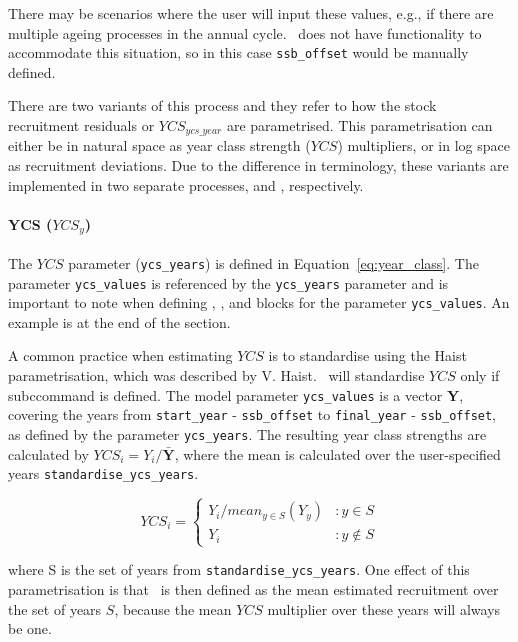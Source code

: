 There may be scenarios where the user will input these values, e.g., if there are multiple ageing processes in the annual cycle. \CNAME\ does not have functionality to accommodate this situation, so in this case \texttt{ssb\_offset} would be manually defined.

There are two variants of this process and they refer to how the stock recruitment residuals or $YCS_{ycs\_year}$ are parametrised. This parametrisation can either be in natural space as year class strength ($YCS$) multipliers, or in log space as recruitment deviations. Due to the difference in terminology, these variants are implemented in two separate processes,  and , respectively.

\paragraph*{YCS ($YCS_y$)}

The $YCS$ parameter (\texttt{ycs\_years}) is defined in Equation~\eqref{eq:year_class}. The parameter \texttt{ycs\_values} is referenced by the \texttt{ycs\_years} parameter and is important to note when defining , , and  blocks for the parameter \texttt{ycs\_values}. An example is at the end of the section.

A common practice when estimating $YCS$ is to standardise using the Haist parametrisation, which was described by V. Haist. \CNAME\ will standardise $YCS$ only if subccommand  is defined. The model parameter \texttt{ycs\_values} is a vector \textbf{Y}, covering the years from \texttt{start\_year} - \texttt{ssb\_offset} to \texttt{final\_year} - \texttt{ssb\_offset}, as defined by the parameter \texttt{ycs\_years}. The resulting year class strengths are calculated by $YCS_i=Y_i/\bar{\textbf{Y}}$, where the mean is calculated over the user-specified years \texttt{standardise\_ycs\_years}.

\[
YCS_i =
\begin{cases}
Y_i / mean_{y \in S}(Y_y) & :y \in S\\
Y_i					 & :y \notin S
\end{cases}
\]

where S is the set of years from \texttt{standardise\_ycs\_years}. One effect of this parametrisation is that \Rzero\ is then defined as the mean estimated recruitment over the set of years $S$, because the mean $YCS$ multiplier over these years will always be one.

